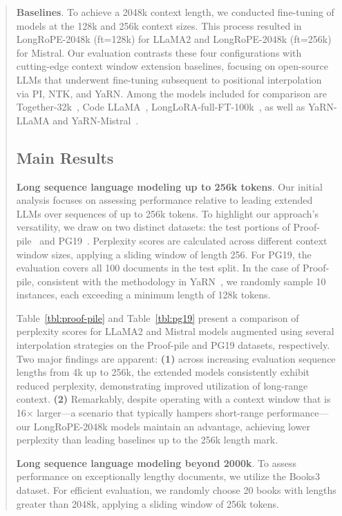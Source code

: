 \begin{abstract}
\textbf{Baselines}. To achieve a 2048k context length, we conducted fine-tuning of models at the 128k and 256k context sizes. This process resulted in LongRoPE-2048k (ft=128k) for LLaMA2 and LongRoPE-2048k (ft=256k) for Mistral. Our evaluation contrasts these four configurations with cutting-edge context window extension baselines, focusing on open-source LLMs that underwent fine-tuning subsequent to positional interpolation via PI, NTK, and YaRN. Among the models included for comparison are Together-32k~\cite{together}, Code LLaMA~\cite{codellama}, LongLoRA-full-FT-100k~\cite{longlora}, as well as YaRN-LLaMA and YaRN-Mistral~\cite{yarn}.

\subsection{Main Results}

\label{sec:mainresult}
\textbf{Long sequence language modeling up to 256k tokens}. Our initial analysis focuses on assessing performance relative to leading extended LLMs over sequences of up to 256k tokens. To highlight our approach's versatility, we draw on two distinct datasets: the test portions of Proof-pile~\cite{pg19} and PG19~\cite{pile}. Perplexity scores are calculated across different context window sizes, applying a sliding window of length 256. For PG19, the evaluation covers all 100 documents in the test split. In the case of Proof-pile, consistent with the methodology in YaRN~\cite{yarn}, we randomly sample 10 instances, each exceeding a minimum length of 128k tokens.

Table~\ref{tbl:proof-pile} and Table~\ref{tbl:pg19} present a comparison of perplexity scores for LLaMA2 and Mistral models augmented using several interpolation strategies on the Proof-pile and PG19 datasets, respectively. Two major findings are apparent: \textbf{(1)} across increasing evaluation sequence lengths from 4k up to 256k, the extended models consistently exhibit reduced perplexity, demonstrating improved utilization of long-range context. \textbf{(2)} Remarkably, despite operating with a context window that is 16$\times$ larger—a scenario that typically hampers short-range performance—our LongRoPE-2048k models maintain an advantage, achieving lower perplexity than leading baselines up to the 256k length mark.

\textbf{Long sequence language modeling beyond 2000k}. To assess performance on exceptionally lengthy documents, we utilize the Books3~\cite{pile} dataset. For efficient evaluation, we randomly choose 20 books with lengths greater than 2048k, applying a sliding window of 256k tokens.


\end{abstract}
